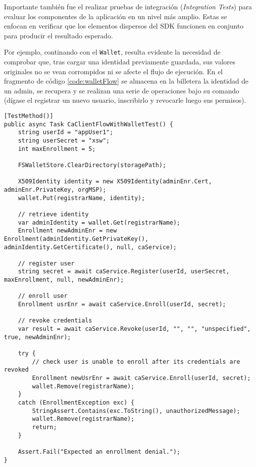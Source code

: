 
Importante tambi\'en fue el realizar pruebas de integraci\'on (\emph{Integration Tests}) para evaluar los componentes de la aplicación en un nivel más amplio. Estas se enfocan en verificar que los elementos dispersos del SDK funcionen en conjunto para producir el resultado esperado.

Por ejemplo, continando con el \texttt{Wallet}, resulta evidente la necesidad de comprobar que, tras cargar una identidad previamente guardada, sus valores originales no se vean corrompidos ni se afecte el flujo de ejecuci\'on. En el fragmento de c\'odigo \ref{code:walletFlow} se almacena en la billetera la identidad de un admin, se recupera y se realizan una serie de operaciones bajo su comando (d\'igase el registrar un nuevo usuario, inscribirlo y revocarle luego sus permisos).

\begin{lstlisting}[caption={Test para verificar el comporamiento de un flujo completo utilizando identidades de una billetera.}, label={code:walletFlow}]
[TestMethod()]
public async Task CaClientFlowWithWalletTest() {
	string userId = "appUser1";
	string userSecret = "xsw";
	int maxEnrollment = 5;

	FSWalletStore.ClearDirectory(storagePath);

	X509Identity identity = new X509Identity(adminEnr.Cert, adminEnr.PrivateKey, orgMSP);
	wallet.Put(registrarName, identity);

	// retrieve identity
	var adminIdentity = wallet.Get(registrarName);
	Enrollment newAdminEnr = new Enrollment(adminIdentity.GetPrivateKey(), adminIdentity.GetCertificate(), null, caService);

	// register user
	string secret = await caService.Register(userId, userSecret, maxEnrollment, null, newAdminEnr);

	// enroll user
	Enrollment usrEnr = await caService.Enroll(userId, secret);

	// revoke credentials
	var result = await caService.Revoke(userId, "", "", "unspecified", true, newAdminEnr);

	try {
		// check user is unable to enroll after its credentials are revoked
		Enrollment newUsrEnr = await caService.Enroll(userId, secret);
		wallet.Remove(registrarName);
	}
	catch (EnrollmentException exc) {
		StringAssert.Contains(exc.ToString(), unauthorizedMessage);
		wallet.Remove(registrarName);
		return;
	}

	Assert.Fail("Expected an enrollment denial.");
}
\end{lstlisting}

